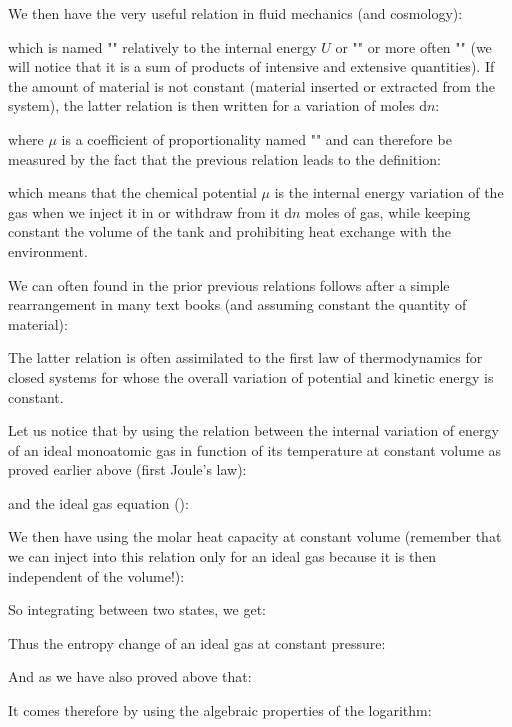 	We then have the very useful relation in fluid mechanics (and cosmology):
	
	which is named "" relatively to the internal energy $U$ or "" or more often "" (we will notice that it is a sum of products of intensive and extensive quantities). If the amount of material is not constant (material inserted or extracted from the system), the latter relation is then written for a variation of moles $\mathrm{d}n$:
	
	where $\mu$ is a coefficient of proportionality named "" and can therefore be measured by the fact that the previous relation leads to the definition:
	
	which means that the chemical potential $\mu$ is the internal energy variation of the gas when we inject it in or withdraw from it $\mathrm{d}n$ moles of gas, while keeping constant the volume of the tank and prohibiting heat exchange with the environment.

	We can often found in the prior previous relations follows after a simple rearrangement in many text books (and assuming constant the quantity of material):
	
	The latter relation is often assimilated to the first law of thermodynamics for closed systems for whose the overall variation of potential and kinetic energy is constant.

	Let us notice that by using the relation between the internal variation of energy of an ideal monoatomic gas in function of its temperature at constant volume as proved earlier above (first Joule's law):
	
	and the ideal gas equation ():
	
	We then have using the molar heat capacity at constant volume (remember that we can inject into this relation only for an ideal gas because it is then independent of the volume!):
	
	So integrating between two states, we get:
	
	Thus the entropy change of an ideal gas at constant pressure:
	
	And as we have also proved above that:
	
	It comes therefore by using the algebraic properties of the logarithm:
	
